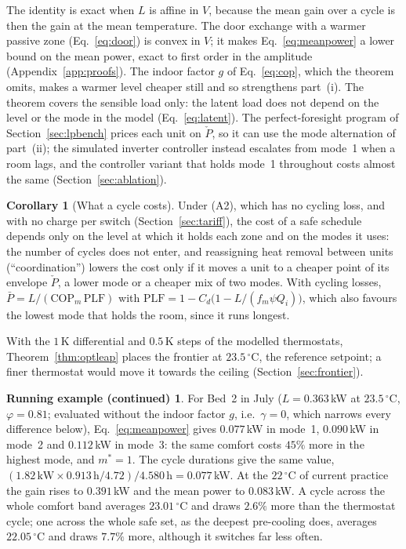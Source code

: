 \documentclass[10pt,a4paper,twocolumn]{article}
\theoremstyle{definition}
\newtheorem{corollary}{Corollary}
\newtheorem*{runexc}{Running example (continued)}
\newcommand{\exL}{0.363}
\newcommand{\exQone}{1.82}
\newcommand{\exBandPct}{2.6}
\newcommand{\exVband}{23.01}
\newcommand{\exSafePct}{7.7}
\newcommand{\exVsafe}{22.05}
\newcommand{\exPhi}{0.81}
\newcommand{\exCopOne}{4.72}
\newcommand{\exPOne}{0.077}
\newcommand{\exPTwo}{0.090}
\newcommand{\exPThree}{0.112}
\newcommand{\exThreeMore}{45}
\newcommand{\exLcur}{0.391}
\newcommand{\exPcur}{0.083}
\newcommand{\exTonH}{0.913}
\newcommand{\exCycleH}{4.580}
\begin{document}
The identity is exact when $L$ is affine in $V$, because the mean gain over a cycle is then the gain at the mean temperature. The door exchange with a warmer passive zone (Eq.~\eqref{eq:door}) is convex in $V$; it makes Eq.~\eqref{eq:meanpower} a lower bound on the mean power, exact to first order in the amplitude (Appendix~\ref{app:proofs}). The indoor factor $g$ of Eq.~\eqref{eq:cop}, which the theorem omits, makes a warmer level cheaper still and so strengthens part~(i). The theorem covers the sensible load only: the latent load does not depend on the level or the mode in the model (Eq.~\eqref{eq:latent}). The perfect-foresight program of Section~\ref{sec:lpbench} prices each unit on $\check P$, so it can use the mode alternation of part~(ii); the simulated inverter controller instead escalates from mode~1 when a room lags, and the controller variant that holds mode~1 throughout costs almost the same (Section~\ref{sec:ablation}).

\begin{corollary}[What a cycle costs]\label{cor:leaps}
Under (A2), which has no cycling loss, and with no charge per switch (Section~\ref{sec:tariff}), the cost of a safe schedule depends only on the level at which it holds each zone and on the modes it uses: the number of cycles does not enter, and reassigning heat removal between units (``coordination'') lowers the cost only if it moves a unit to a cheaper point of its envelope $\check P$, a lower mode or a cheaper mix of two modes. With cycling losses, $\bar P=L/(\mathrm{COP}_m\,\mathrm{PLF})$ with $\mathrm{PLF}=1-C_d\bigl(1-L/(f_m\psi Q_i)\bigr)$, which also favours the lowest mode that holds the room, since it runs longest.
\end{corollary}

With the $1\,$K differential and $0.5\,$K steps of the modelled thermostats, Theorem~\ref{thm:optleap} places the frontier at $23.5\,^{\circ}$C, the reference setpoint; a finer thermostat would move it towards the ceiling (Section~\ref{sec:frontier}).

\begin{runexc}
For Bed~2 in July ($L=\exL\,$kW at $23.5\,^{\circ}$C, $\varphi=\exPhi$; evaluated without the indoor factor $g$, i.e.\ $\gamma=0$, which narrows every difference below), Eq.~\eqref{eq:meanpower} gives $\exPOne\,$kW in mode~1, $\exPTwo\,$kW in mode~2 and $\exPThree\,$kW in mode~3: the same comfort costs $\exThreeMore\%$ more in the highest mode, and $m^\ast=1$. The cycle durations give the same value, $(\exQone\,\text{kW}\times\exTonH\,\text{h}/\exCopOne)/\exCycleH\,\text{h}=\exPOne\,$kW. At the $22\,^{\circ}$C of current practice the gain rises to $\exLcur\,$kW and the mean power to $\exPcur\,$kW. A cycle across the whole comfort band averages $\exVband\,^{\circ}$C and draws $\exBandPct\%$ more than the thermostat cycle; one across the whole safe set, as the deepest pre-cooling does, averages $\exVsafe\,^{\circ}$C and draws $\exSafePct\%$ more, although it switches far less often.
\end{runexc}
\end{document}

